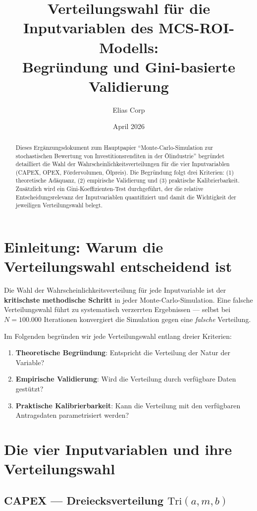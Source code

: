 \documentclass[12pt,a4paper]{article}
\title{\textbf{Verteilungswahl für die Inputvariablen des MCS-ROI-Modells:\\Begründung und Gini-basierte Validierung}}
\author{Elias Corp}
\date{April 2026}
\begin{document}
\maketitle

\begin{abstract}
Dieses Ergänzungsdokument zum Hauptpapier ``Monte-Carlo-Simulation zur stochastischen Bewertung von Investitionsrenditen in der Ölindustrie'' begründet detailliert die Wahl der Wahrscheinlichkeitsverteilungen für die vier Inputvariablen (CAPEX, OPEX, Fördervolumen, Ölpreis). Die Begründung folgt drei Kriterien: (1) theoretische Adäquanz, (2) empirische Validierung und (3) praktische Kalibrierbarkeit. Zusätzlich wird ein Gini-Koeffizienten-Test durchgeführt, der die relative Entscheidungsrelevanz der Inputvariablen quantifiziert und damit die Wichtigkeit der jeweiligen Verteilungswahl belegt.
\end{abstract}

\section{Einleitung: Warum die Verteilungswahl entscheidend ist}

Die Wahl der Wahrscheinlichkeitsverteilung für jede Inputvariable ist der \textbf{kritischste methodische Schritt} in jeder Monte-Carlo-Simulation. Eine falsche Verteilungswahl führt zu systematisch verzerrten Ergebnissen --- selbst bei $N = 100.000$ Iterationen konvergiert die Simulation gegen eine \textit{falsche} Verteilung.

Im Folgenden begründen wir jede Verteilungswahl entlang dreier Kriterien:

\begin{enumerate}
\item \textbf{Theoretische Begründung}: Entspricht die Verteilung der Natur der Variable?
\item \textbf{Empirische Validierung}: Wird die Verteilung durch verfügbare Daten gestützt?
\item \textbf{Praktische Kalibrierbarkeit}: Kann die Verteilung mit den verfügbaren Antragsdaten parametrisiert werden?
\end{enumerate}

\section{Die vier Inputvariablen und ihre Verteilungswahl}

\subsection{CAPEX --- Dreiecksverteilung $\text{Tri}(a, m, b)$}
\end{document}
